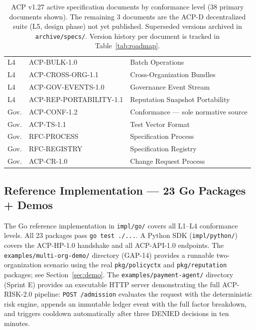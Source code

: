 \documentclass[11pt]{article}
\theoremstyle{definition}
\begin{document}
\begin{table}[h!]
\begin{tabular}{@{}lll@{}}
L4 & ACP-BULK-1.0 & Batch Operations \\
L4 & ACP-CROSS-ORG-1.1 & Cross-Organization Bundles \\
L4 & ACP-GOV-EVENTS-1.0 & Governance Event Stream \\
L4 & ACP-REP-PORTABILITY-1.1 & Reputation Snapshot Portability \\
\midrule
Gov. & ACP-CONF-1.2 & Conformance --- sole normative source \\
Gov. & ACP-TS-1.1 & Test Vector Format \\
Gov. & RFC-PROCESS & Specification Process \\
Gov. & RFC-REGISTRY & Specification Registry \\
Gov. & ACP-CR-1.0 & Change Request Process \\
\bottomrule
\end{tabular}
\caption{ACP v1.27 active specification documents by conformance level (38 primary documents shown).
The remaining 3 documents are the ACP-D decentralized suite (L5, design phase) not yet published.
Superseded versions archived in \texttt{archive/specs/}.
Version history per document is tracked in Table~\ref{tab:roadmap}.}
\end{table}

\subsection{Reference Implementation --- 23 Go Packages + Demos}
\label{sec:implementation}

The Go reference implementation in \texttt{impl/go/} covers all L1--L4 conformance levels.
All 23 packages pass \texttt{go test ./...}.
A Python SDK (\texttt{impl/python/}) covers the ACP-HP-1.0 handshake and all ACP-API-1.0 endpoints.
The \texttt{examples/multi-org-demo/} directory (GAP-14) provides a runnable two-organization scenario using the real \texttt{pkg/policyctx} and \texttt{pkg/reputation} packages; see Section~\ref{sec:demo}.
The \texttt{examples/payment-agent/} directory (Sprint E) provides an executable HTTP server demonstrating the full ACP-RISK-2.0 pipeline: \texttt{POST /admission} evaluates the request with the deterministic risk engine, appends an immutable ledger event with the full factor breakdown, and triggers cooldown automatically after three DENIED decisions in ten minutes.
\end{document}
